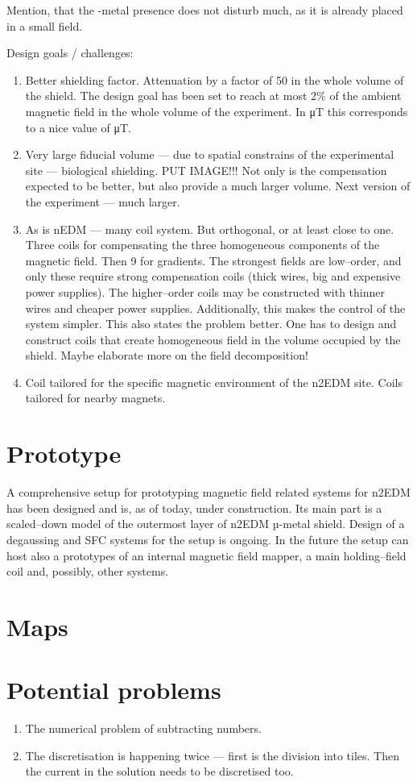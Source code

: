 Mention, that the \micro-metal presence does not disturb much, as it is already placed in a small field.


Design goals / challenges:
\begin{enumerate}
  \item Better shielding factor. Attenuation by a factor of 50 in the whole volume of the shield. The design goal has been set to reach at most 2\% of the ambient magnetic field in the
  whole volume of the experiment. In \unit[50]{\micro T} this corresponds to a nice value of \unit[1]{\micro T}.
  \item Very large fiducial volume --- due to spatial constrains of the experimental site --- biological shielding. PUT IMAGE!!! Not only is the compensation expected to be better, but also provide a much larger volume. Next version of the experiment --- much larger.
  \item As is nEDM --- many coil system. But orthogonal, or at least close to one. Three coils for compensating the three homogeneous components of the magnetic field. Then 9 for gradients. The strongest fields are low--order, and only these require strong compensation coils (thick wires, big and expensive power supplies). The higher--order coils may be constructed with thinner wires and cheaper power supplies.
  Additionally, this makes the control of the system simpler.
  This also states the problem better. One has to design and construct coils that create homogeneous field in the volume occupied by the shield. Maybe elaborate more on the field decomposition!
  \item Coil tailored for the specific magnetic environment of the n2EDM site. Coils tailored for nearby magnets.
\end{enumerate}


\section{Prototype}
A comprehensive setup for prototyping magnetic field related systems for n2EDM has been designed and is, as of today, under construction. Its main part is a scaled--down model of the outermost layer of n2EDM µ-metal shield. Design of a degaussing and SFC systems for the setup is ongoing. In the future the setup can host also a prototypes of an internal magnetic field mapper, a main holding--field coil and, possibly, other systems.

\section{Maps}

\section{Potential problems}
\begin{enumerate}
  \item The numerical problem of subtracting numbers.
  \item The discretisation is happening twice --- first is the division into tiles. Then the current in the solution needs to be discretised too.
\end{enumerate}
